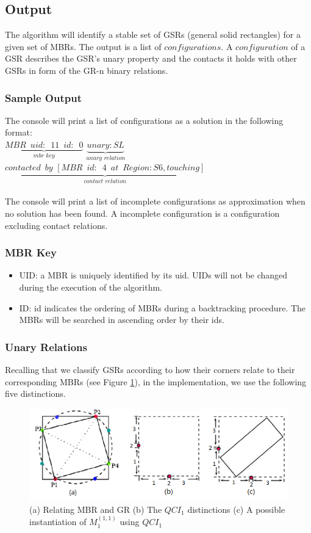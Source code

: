 \documentclass{article}
\begin{document}
\subsection{Output}
The algorithm will identify a stable set of GSRs (general solid rectangles) for a given set of MBRs. The output is a list of $configurations$. A $configuration$ of a GSR describes the GSR's unary property and the contacts it holds with other GSRs in form of the GR-n binary relations.  

\subsubsection{Sample Output}
The console will print a list of configurations as a solution in the following format:
\\$\underbrace{MBR\,\,\, uid: \,\,\,11 \,\,\,id: \,\,\,0}_{mbr \,\, key}$ $\underbrace{unary: SL}_{unary\,\, relation}$ $\underbrace{contacted\,\,\, by\,\, [ MBR\,\,\,id:\,\,\,4\,\,\,at\,\,\,Region: S6, touching ]}_{contact \,\,relation}$
\\\\The console will print a list of incomplete configurations as approximation when no solution has been found. A incomplete configuration is a configuration excluding contact relations.
\subsubsection{MBR Key}
\begin{itemize}
\item UID: a MBR is uniquely identified by its uid. UIDs will not be changed during the execution of the algorithm.
\item ID: id indicates the ordering of MBRs during a backtracking procedure. The MBRs will be searched in ascending order by their ids. 
\end{itemize}
\subsubsection{Unary Relations} 
Recalling that we classify GSRs according to how their corners relate to their corresponding MBRs (see Figure \ref{unary}), in the implementation, we use the following five distinctions.  
\begin{figure}[h!]
\centering\includegraphics[scale=0.55]{combo1}\caption{(a) Relating MBR and GR (b) The $QCI_{1}$ distinctions (c) A possible instantiation of $M_{1}^{(1,1)}$ using $QCI_{1}$ }
\label{unary} 
\end{figure}
\end{document}
